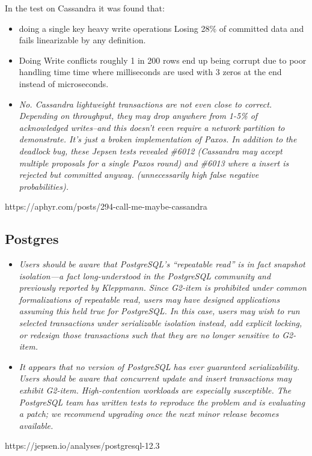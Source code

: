 \documentclass[a4paper,10pt,titlepage]{report}
\begin{document}
    In the test on Cassandra it was found that:
    \begin{itemize}
        \item doing a single key heavy write operations Losing 28\% of committed data and fails linearizable by any definition.
        \item Doing Write conflicts roughly 1 in 200 rows end up being corrupt due to poor handling time time where milliseconds are used with 3 zeros at the end instead of microseconds.
        \item \textit{No. Cassandra lightweight transactions are not even close to correct. Depending on throughput, they may drop anywhere from 1-5\% of acknowledged writes–and this doesn’t even require a network partition to demonstrate. It’s just a broken implementation of Paxos. In addition to the deadlock bug, these Jepsen tests revealed \#6012 (Cassandra may accept multiple proposals for a single Paxos round) and \#6013 where a insert is rejected but committed anyway. (unnecessarily high false negative probabilities).}
    \end{itemize}

    https://aphyr.com/posts/294-call-me-maybe-cassandra


    \subsection{Postgres}
    
    
    
    \begin{itemize}
        \item \textit{Users should be aware that PostgreSQL’s “repeatable read” is in fact snapshot isolation—a fact long-understood in the PostgreSQL community and previously reported by Kleppmann. Since G2-item is prohibited under common formalizations of repeatable read, users may have designed applications assuming this held true for PostgreSQL. In this case, users may wish to run selected transactions under serializable isolation instead, add explicit locking, or redesign those transactions such that they are no longer sensitive to G2-item.}
        \item \textit{It appears that no version of PostgreSQL has ever guaranteed serializability. Users should be aware that concurrent update and insert transactions may exhibit G2-item. High-contention workloads are especially susceptible. The PostgreSQL team has written tests to reproduce the problem and is evaluating a patch; we recommend upgrading once the next minor release becomes available.}
    \end{itemize}
    https://jepsen.io/analyses/postgresql-12.3
\end{document}
